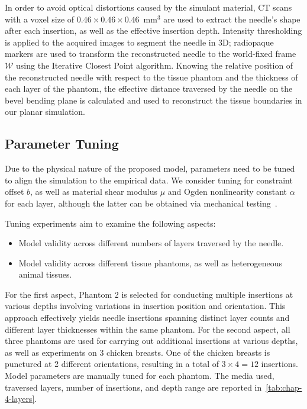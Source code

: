 In order to avoid optical distortions caused by the simulant material, CT scans with a voxel size of $0.46\times0.46\times0.46$~mm$^{3}$ are used to extract the needle's shape after each insertion, as well as the effective insertion depth. Intensity thresholding is applied to the acquired images to segment the needle in 3D; radiopaque markers are used to transform the reconstructed needle to the world-fixed frame $\mathcal{W}$ using the Iterative Closest Point algorithm. Knowing the relative position of the reconstructed needle with respect to the tissue phantom and the thickness of each layer of the phantom, the effective distance traversed by the needle on the bevel bending plane is calculated and used to reconstruct the tissue boundaries in our planar simulation.

\subsection{Parameter Tuning}
\label{sec:chap-4-parameter-tuning}
Due to the physical nature of the proposed model, parameters need to be tuned to align the simulation to the empirical data. We consider tuning for constraint offset $b$, as well as material shear modulus $\mu$ and Ogden nonlinearity constant $\alpha$ for each layer, although the latter can be obtained via mechanical testing~\parencite{singhMechanicalPropertiesWholebody2021}.

Tuning experiments aim to examine the following aspects: 
\begin{itemize}
\item Model validity across different numbers of layers traversed by the needle.
\item Model validity across different tissue phantoms, as well as heterogeneous animal tissues.
\end{itemize}

For the first aspect, Phantom 2 is selected for conducting multiple insertions at various depths involving variations in insertion position and orientation. This approach effectively yields needle insertions spanning distinct layer counts and different layer thicknesses within the same phantom. For the second aspect, all three phantoms are used for carrying out additional insertions at various depths, as well as experiments on 3 chicken breasts. One of the chicken breasts is punctured at 2 different orientations, resulting in a total of $3\times4 = 12$ insertions. Model parameters are manually tuned for each phantom. The media used, traversed layers, number of insertions, and depth range are reported in~\cref{tab:chap-4-layers}.

